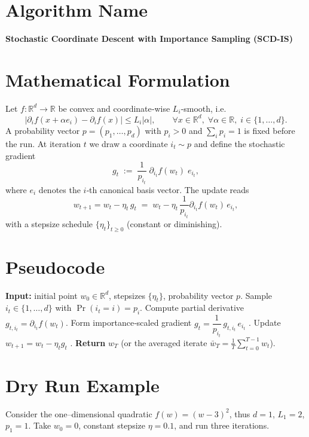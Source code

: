 \documentclass{article}
\newcommand{\R}{\mathbb{R}}
\begin{document}
\section*{Algorithm Name}
\textbf{Stochastic Coordinate Descent with Importance Sampling (SCD-IS)}

\section*{Mathematical Formulation}
Let $f:\R^{d}\rightarrow\R$ be convex and coordinate‑wise $L_i$‑smooth, i.e.
\[
\big|\partial_i f(x+\alpha e_i)-\partial_i f(x)\big|\le L_i|\alpha|,\qquad\forall x\in\R^{d},\;\forall\alpha\in\R,\;i\in\{1,\dots,d\}.
\]
A probability vector $p=(p_1,\dots,p_d)$ with $p_i>0$ and $\sum_i p_i=1$ is fixed before the run.
At iteration $t$ we draw a coordinate $i_t\sim p$ and define the stochastic gradient
\[
g_t \;:=\; \frac{1}{p_{i_t}}\;\partial_{i_t} f(w_t)\;e_{i_t},
\tag{1}
\]
where $e_i$ denotes the $i$‑th canonical basis vector.  
The update reads
\[
w_{t+1}=w_t-\eta_t\,g_t
\;=\;
w_t-\eta_t\,\frac{1}{p_{i_t}}\partial_{i_t}f(w_t)\,e_{i_t},
\tag{2}
\]
with a stepsize schedule $\{\eta_t\}_{t\ge0}$ (constant or diminishing).

\section*{Pseudocode}
\begin{algorithm}[H]
\caption{Stochastic Coordinate Descent with Importance Sampling}
\begin{algorithmic}[1]
\State \textbf{Input:} initial point $w_0\in\R^{d}$, stepsizes $\{\eta_t\}$, probability vector $p$.
    \State Sample $i_t\in\{1,\dots,d\}$ with $\Pr(i_t=i)=p_i$.
    \State Compute partial derivative $g_{t,i_t}= \partial_{i_t}f(w_t)$.
    \State Form importance‑scaled gradient 
          $g_t=\dfrac{1}{p_{i_t}}\,g_{t,i_t}\,e_{i_t}$ .
    \State Update $w_{t+1}=w_t-\eta_t g_t$ .
\EndFor
\State \textbf{Return} $w_T$ (or the averaged iterate $\bar w_T=\tfrac1T\sum_{t=0}^{T-1}w_t$).
\end{algorithmic}
\end{algorithm}

\section*{Dry Run Example}
Consider the one–dimensional quadratic $f(w)=(w-3)^2$, thus $d=1$, $L_1=2$, $p_1=1$.
Take $w_0=0$, constant stepsize $\eta=0.1$, and run three iterations.
\end{document}
